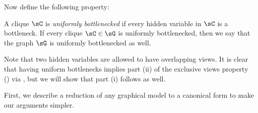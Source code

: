 Now define the following property:
\begin{property}
  \label{prop:bottleneck}
  A clique $\sC$ is \emph{uniformly bottlenecked} if
  every hidden variable in $\sC$ is a bottleneck. 
  If every clique $\sC \in \sG$ is uniformly bottlenecked, then we say
  that the graph $\sG$ is uniformly bottlenecked as well.
\end{property}
Note that two hidden variables are allowed to have overlapping views.
It is clear that having uniform bottlenecks implies part (ii)
of the exclusive views property () via \TensorFactorize,
but we will show that part (i) follows as well.



First, we describe a reduction of any graphical model to
  a canonical form to make our arguments simpler.

